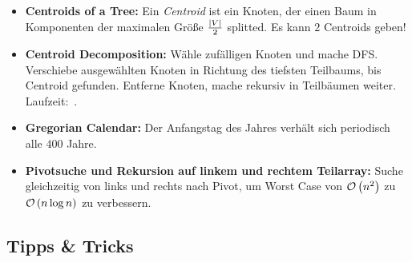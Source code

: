 \begin{itemize}
	\item \textbf{Centroids of a Tree:}
	Ein \emph{Centroid} ist ein Knoten, der einen Baum in Komponenten der maximalen Größe $\frac{\left|V\right|}{2}$ splitted.
	Es kann $2$ Centroids geben!
	
	\item \textbf{Centroid Decomposition:}
	Wähle zufälligen Knoten und mache DFS.
	Verschiebe ausgewählten Knoten in Richtung des tiefsten Teilbaums, bis Centroid gefunden. Entferne Knoten, mache rekursiv in Teilbäumen weiter. Laufzeit:~.
	\item \textbf{Gregorian Calendar:} Der Anfangstag des Jahres verhält sich periodisch alle $400$ Jahre.

	\item \textbf{Pivotsuche und Rekursion auf linkem und rechtem Teilarray:}
	Suche gleichzeitig von links und rechts nach Pivot, um Worst Case von
	$\mathcal{O}\left(n^2\right)$ zu $\mathcal{O}\left(n\log n\right)$ zu verbessern.
\end{itemize}

\subsection{Tipps \& Tricks}

